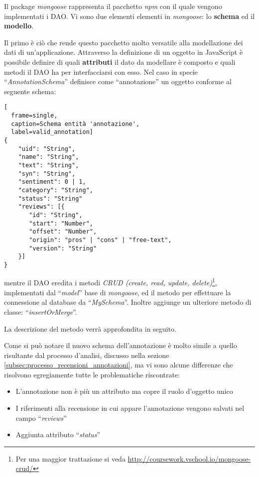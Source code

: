 Il package \textit{mongoose} rappresenta il pacchetto \textit{npm} con il quale
vengono implementati i \gls{DAO}. Vi sono due elementi elementi in
\textit{mongoose}: lo \textbf{schema} ed il \textbf{modello}.

Il primo è ciò che rende questo pacchetto molto versatile alla modellazione dei
dati di un'applicazione. Attraverso la definizione di un oggetto in JavaScript è
possibile definire di quali \textbf{attributi} il dato da modellare è composto e
quali metodi il \gls{DAO} ha per interfacciarsi con esso. Nel caso in specie
``\textit{AnnotationSchema}'' definisce come ``annotazione'' un oggetto conforme
al seguente schema:
\begin{center}
\begin{lstlisting}[
  frame=single,
  caption=Schema entità 'annotazione',
  label=valid_annotation]
{
    "uid": "String",
    "name": "String",
    "text": "String",
    "syn": "String",
    "sentiment": 0 | 1,
    "category": "String",
    "status": "String"
    "reviews": [{
       "id": "String",
       "start": "Number",
       "offset": "Number",
       "origin": "pros" | "cons" | "free-text",
       "version": "String"
    }]
}
\end{lstlisting}
\end{center}

mentre il \gls{DAO} eredita i metodi \textit{CRUD (create, read, update,
delete)}\footnote{Per una maggior trattazione si veda
\url{http://coursework.vschool.io/mongoose-crud/}}, implementati dal
``\textit{model}'' base di \textit{mongoose}, ed il metodo per effettuare la
connessione al database da ``\textit{MySchema}''. Inoltre aggiunge un
ulteriore metodo di classe: ``\textit{insertOrMerge}''.

La descrizione del metodo verrà approfondita in seguito.

Come si può notare il nuovo schema dell'annotazione è molto simile a quello
risultante dal processo d'analisi, discusso nella sezione
\ref{subsec:processo_recensioni_annotazioni}, ma vi sono alcune differenze che
risolvono egregiamente tutte le problematiche riscontrate:
\begin{itemize}
\item L'annotazione non è più un attributo ma copre il ruolo d'oggetto unico
\item I riferimenti alla recensione in cui appare l'annotazione vengono salvati
nel campo ``\textit{reviews}''
\item Aggiunta attributo ``\textit{status}''
\end{itemize}

